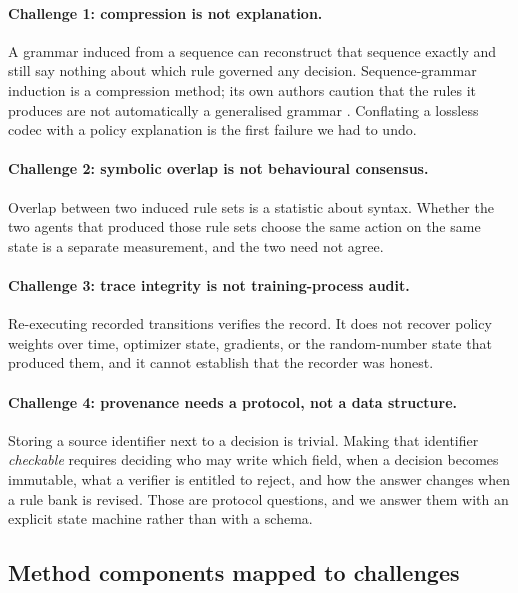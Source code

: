 \documentclass[11pt,a4paper]{article}
\begin{document}
\paragraph{Challenge 1: compression is not explanation.}
A grammar induced from a sequence can reconstruct that sequence exactly and still say nothing about which rule governed any decision. Sequence-grammar induction is a compression method; its own authors caution that the rules it produces are not automatically a generalised grammar \citep{nevillmanning1997}. Conflating a lossless codec with a policy explanation is the first failure we had to undo.

\paragraph{Challenge 2: symbolic overlap is not behavioural consensus.}
Overlap between two induced rule sets is a statistic about syntax. Whether the two agents that produced those rule sets choose the same action on the same state is a separate measurement, and the two need not agree.

\paragraph{Challenge 3: trace integrity is not training-process audit.}
Re-executing recorded transitions verifies the record. It does not recover policy weights over time, optimizer state, gradients, or the random-number state that produced them, and it cannot establish that the recorder was honest.

\paragraph{Challenge 4: provenance needs a protocol, not a data structure.}
Storing a source identifier next to a decision is trivial. Making that identifier \emph{checkable} requires deciding who may write which field, when a decision becomes immutable, what a verifier is entitled to reject, and how the answer changes when a rule bank is revised. Those are protocol questions, and we answer them with an explicit state machine rather than with a schema.

\subsection{Method components mapped to challenges}
\label{sec:intro-mapping}
\end{document}
